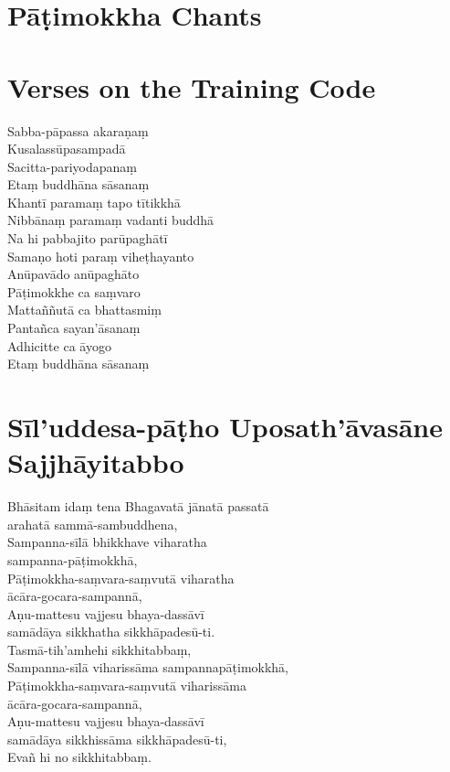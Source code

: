 \chapter{Pāṭimokkha Chants}

\chapter{Verses on the Training Code}

\begin{leader}
\end{leader}

Sabba-pāpassa akaraṇaṃ\\
Kusalassūpasampadā\\
Sacitta-pariyodapanaṃ\\
Etaṃ buddhāna sāsanaṃ\\
Khantī paramaṃ tapo tītikkhā\\
Nibbānaṃ paramaṃ vadanti buddhā\\
Na hi pabbajito parūpaghātī\\
Samaṇo hoti paraṃ viheṭhayanto\\
Anūpavādo anūpaghāto\\
Pāṭimokkhe ca saṃvaro\\
Mattaññutā ca bhattasmiṃ\\
Pantañca sayan'āsanaṃ\\
Adhicitte ca āyogo\\
Etaṃ buddhāna sāsanaṃ

\chapter{Sīl’uddesa-pāṭho Uposath’āvasāne Sajjhāyitabbo}

Bhāsitam idaṃ tena Bhagavatā jānatā passatā\\
arahatā sammā-sambuddhena,\\
Sampanna-sīlā bhikkhave viharatha\\
sampanna-pāṭimokkhā,\\
Pāṭimokkha-saṃvara-saṃvutā viharatha\\
ācāra-gocara-sampannā,\\
Aṇu-mattesu vajjesu bhaya-dassāvī\\
samādāya sikkhatha sikkhāpadesū-ti.\\
Tasmā-tih’amhehi sikkhitabbaṃ,\\
Sampanna-sīlā viharissāma sampannapāṭimokkhā,\\
Pāṭimokkha-saṃvara-saṃvutā viharissāma\\
ācāra-gocara-sampannā,\\
Aṇu-mattesu vajjesu bhaya-dassāvī\\
samādāya sikkhissāma sikkhāpadesū-ti,\\
Evañ hi no sikkhitabbaṃ.

